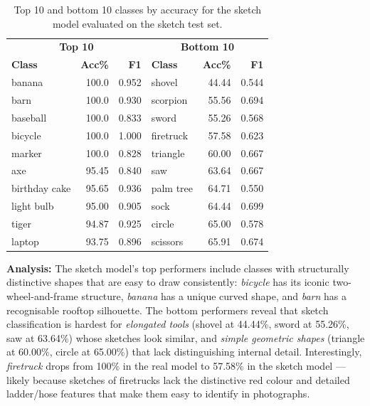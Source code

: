 \documentclass[12pt, a4paper]{article}
\begin{document}
\begin{table}[H]
\centering
\caption{Top 10 and bottom 10 classes by accuracy for the sketch model
evaluated on the sketch test set.}
\label{tab:top_bottom_sketch}
\begin{tabular}{lrr|lrr}
\toprule
\multicolumn{3}{c|}{\textbf{Top 10}} & \multicolumn{3}{c}{\textbf{Bottom 10}} \\
\textbf{Class} & \textbf{Acc\%} & \textbf{F1} &
\textbf{Class} & \textbf{Acc\%} & \textbf{F1} \\
\midrule
banana       & 100.0 & 0.952 & shovel     & 44.44 & 0.544 \\
barn         & 100.0 & 0.930 & scorpion   & 55.56 & 0.694 \\
baseball     & 100.0 & 0.833 & sword      & 55.26 & 0.568 \\
bicycle      & 100.0 & 1.000 & firetruck  & 57.58 & 0.623 \\
marker       & 100.0 & 0.828 & triangle   & 60.00 & 0.667 \\
axe          & 95.45 & 0.840 & saw        & 63.64 & 0.667 \\
birthday cake & 95.65 & 0.936 & palm tree  & 64.71 & 0.550 \\
light bulb   & 95.00 & 0.905 & sock       & 64.44 & 0.699 \\
tiger        & 94.87 & 0.925 & circle     & 65.00 & 0.578 \\
laptop       & 93.75 & 0.896 & scissors   & 65.91 & 0.674 \\
\bottomrule
\end{tabular}
\end{table}

\textbf{Analysis:} The sketch model's top performers include classes with
structurally distinctive shapes that are easy to draw consistently:
\emph{bicycle} has its iconic two-wheel-and-frame structure, \emph{banana} has
a unique curved shape, and \emph{barn} has a recognisable rooftop silhouette.
The bottom performers reveal that sketch classification is hardest for
\emph{elongated tools} (shovel at 44.44\%, sword at 55.26\%, saw at 63.64\%)
whose sketches look similar, and \emph{simple geometric shapes} (triangle at
60.00\%, circle at 65.00\%) that lack distinguishing internal detail.
Interestingly, \emph{firetruck} drops from 100\% in the real model to 57.58\%
in the sketch model --- likely because sketches of firetrucks lack the
distinctive red colour and detailed ladder/hose features that make them easy
to identify in photographs.
\end{document}
